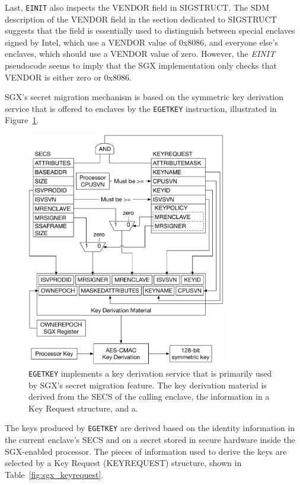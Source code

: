 Last, \texttt{EINIT} also inspects the VENDOR field in SIGSTRUCT. The SDM
description of the VENDOR field in the section dedicated to SIGSTRUCT suggests
that the field is essentially used to distinguish between special enclaves
signed by Intel, which use a VENDOR value of 0x8086, and everyone else's
enclaves, which should use a VENDOR value of zero. However, the \textit{EINIT}
pseudocode seems to imply that the SGX implementation only checks that
VENDOR is either zero or 0x8086.


\label{sec:sgx_egetkey}

SGX's secret migration mechanism is based on the symmetric key derivation
service that is offered to enclaves by the \texttt{EGETKEY} instruction,
illustrated in Figure~\ref{fig:sgx_egetkey}.

\begin{figure}[hbt]
  \centering
  \includegraphics[width=87mm]{figures/sgx_egetkey.pdf}
  \caption{
    \texttt{EGETKEY} implements a key derivation service that is primarily used
    by SGX's secret migration feature. The key derivation material is derived
    from the SECS of the calling enclave, the information in a Key Request
    structure, and a.
  }
  \label{fig:sgx_egetkey}
\end{figure}

The keys produced by \texttt{EGETKEY} are derived based on the identity
information in the current enclave's SECS and on a secret stored in secure
hardware inside the SGX-enabled processor. The pieces of information used to
derive the keys are selected by a Key Request (KEYREQUEST) structure, shown in
Table~\ref{fig:sgx_keyrequest}.

